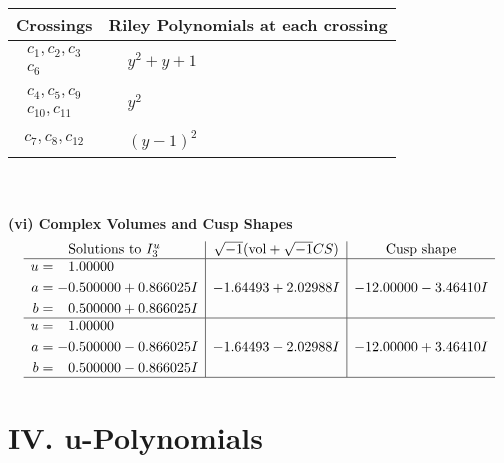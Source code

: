 \documentclass[1p]{elsarticle_modified}
\theoremstyle{definition}
\newcommand{\I}{\sqrt{-1}}
\begin{document}
\begin{tabular}{m{50pt}|m{274pt}}
Crossings & \hspace{64pt}Riley Polynomials at each crossing \\
\hline $$\begin{aligned}c_{1},c_{2},c_{3}\\c_{6}\end{aligned}$$&$\begin{aligned}
&y^2+y+1
\end{aligned}$\\
\hline $$\begin{aligned}c_{4},c_{5},c_{9}\\c_{10},c_{11}\end{aligned}$$&$\begin{aligned}
&y^2
\end{aligned}$\\
\hline $$\begin{aligned}c_{7},c_{8},c_{12}\end{aligned}$$&$\begin{aligned}
&(y-1)^2
\end{aligned}$\\
\hline
\end{tabular}\\~\\
\newpage\flushleft \textbf{(vi) Complex Volumes and Cusp Shapes}
$$\begin{array}{c|c|c}  
\text{Solutions to }I^u_{3}& \I (\text{vol} + \sqrt{-1}CS) & \text{Cusp shape}\\
 \hline 
\begin{aligned}
u &= \phantom{-}1.00000\phantom{ +0.000000I} \\
a &= -0.500000 + 0.866025 I \\
b &= \phantom{-}0.500000 + 0.866025 I\end{aligned}
 & -1.64493 + 2.02988 I & -12.00000 - 3.46410 I \\ \hline\begin{aligned}
u &= \phantom{-}1.00000\phantom{ +0.000000I} \\
a &= -0.500000 - 0.866025 I \\
b &= \phantom{-}0.500000 - 0.866025 I\end{aligned}
 & -1.64493 - 2.02988 I & -12.00000 + 3.46410 I\\
 \hline 
 \end{array}$$\newpage
\newpage\renewcommand{\arraystretch}{1}
\centering \section*{ IV. u-Polynomials}
\end{document}
